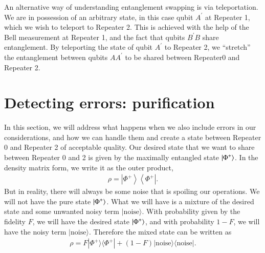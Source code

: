 An alternative way of understanding entanglement swapping is via teleportation.
We are in possession of an arbitrary state, in this case qubit $A^{\prime}$ at Repeater 1, which we wish to teleport to Repeater 2.
This is achieved with the help of the Bell measurement at Repeater 1, and the fact that qubits $B^{\prime}B$ share entanglement.
By teleporting the state of qubit $A^{\prime}$ to Repeater 2, we ``stretch'' the entanglement between qubits $AA^{\prime}$ to be shared between Repeater0 and Repeater 2.


\section{Detecting errors: purification}
\label{sec:12-4_purification}

In this section, we will address what happens when we also include errors in our considerations, and how we can handle them and create a state between Repeater 0 and Repeater 2 of acceptable quality.
Our desired state that we want to share between Repeater 0 and 2 is given by the maximally entangled state $\left| \Phi^+ \right\rangle$.
In the density matrix form, we write it as the outer product,
\begin{align}
    \rho = \left|\Phi^{+}\right\rangle\left\langle\Phi^{+}\right|.
\end{align}
But in reality, there will always be some noise that is spoiling our operations.
We will not have the pure state $\left| \Phi^+ \right\rangle$.
What we will have is a mixture of the desired state and some unwanted noisy term $|\text{noise}\rangle$.
With probability given by the fidelity $F$, we will have the desired state $\left| \Phi^+ \right\rangle$, and with probability $1-F$, we will have the noisy term $|\text{noise}\rangle$.
Therefore the mixed state can be written as
\begin{align}
    \rho = F |\Phi^{+}\rangle\langle\Phi^{+}|+(1-F)| \text {noise}\rangle\langle\text {noise}|.
\end{align}

